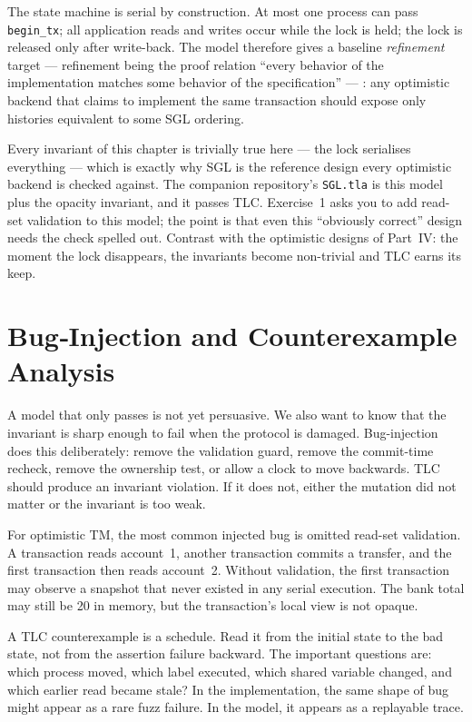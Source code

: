 The state machine is serial by construction.  At most one process can pass
\texttt{begin\_tx}; all application reads and writes occur while the lock is
held; the lock is released only after write-back.  The model therefore gives a
baseline \emph{refinement} target --- refinement being the proof relation
``every behavior of the implementation matches some behavior of the
specification'' --- : any optimistic backend that claims to implement the
same transaction should expose only histories equivalent to some SGL ordering.

Every invariant of this chapter is trivially true here --- the lock serialises
everything --- which is exactly why SGL is the reference design every optimistic
backend is checked against.  The companion repository's \texttt{SGL.tla} is this
model plus the opacity invariant, and it passes TLC.  Exercise~1 asks you to add
read-set validation to this model; the point is that even this ``obviously
correct'' design needs the check spelled out.  Contrast with the optimistic
designs of Part~IV: the moment the lock disappears, the invariants become
non-trivial and TLC earns its keep.

\section{Bug‑Injection and Counterexample Analysis}

A model that only passes is not yet persuasive.  We also want to know that the
invariant is sharp enough to fail when the protocol is damaged.  Bug-injection
does this deliberately: remove the validation guard, remove the commit-time
recheck, remove the ownership test, or allow a clock to move backwards.  TLC
should produce an invariant violation.  If it does not, either the mutation did
not matter or the invariant is too weak.

For optimistic TM, the most common injected bug is omitted read-set validation.
A transaction reads account~1, another transaction commits a transfer, and the
first transaction then reads account~2.  Without validation, the first
transaction may observe a snapshot that never existed in any serial execution.
The bank total may still be 20 in memory, but the transaction's local view is
not opaque.

A TLC counterexample is a schedule.  Read it from the initial state to the bad
state, not from the assertion failure backward.  The important questions are:
which process moved, which label executed, which shared variable changed, and
which earlier read became stale?  In the implementation, the same shape of bug
might appear as a rare fuzz failure.  In the model, it appears as a replayable
trace.

